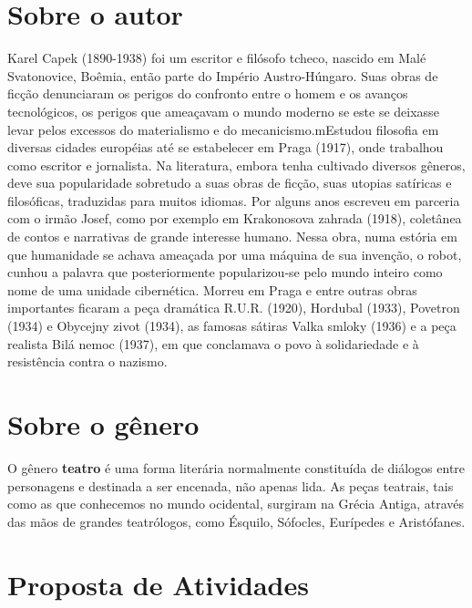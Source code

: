\documentclass[11pt]{extarticle}
\begin{document}

\section{Sobre o autor}

Karel Capek (1890-1938) foi um escritor e filósofo tcheco, nascido em Malé Svatonovice, Boêmia, então parte do Império Austro-Húngaro. Suas obras de ficção denunciaram os perigos do confronto entre o homem e os avanços tecnológicos, os perigos que ameaçavam o mundo moderno se este se deixasse levar pelos excessos do materialismo e do mecanicismo.mEstudou filosofia em diversas cidades européias até se estabelecer em Praga (1917), onde trabalhou como escritor e jornalista. Na literatura, embora tenha cultivado diversos gêneros, deve sua popularidade sobretudo a suas obras de ficção, suas utopias satíricas e filosóficas, traduzidas para muitos idiomas. Por alguns anos escreveu em parceria com o irmão Josef, como por exemplo em Krakonosova zahrada (1918), coletânea de contos e narrativas de grande interesse humano. Nessa obra, numa estória em que humanidade se achava ameaçada por uma máquina de sua invenção, o robot, cunhou a palavra que posteriormente popularizou-se pelo mundo inteiro como nome de uma unidade cibernética. Morreu em Praga e entre outras obras importantes ficaram a peça dramática R.U.R. (1920), Hordubal (1933), Povetron (1934) e Obycejny zivot (1934), as famosas sátiras Valka smloky (1936) e a peça realista Bilá nemoc (1937), em que conclamava o povo à solidariedade e à resistência contra o nazismo.

\section{Sobre o gênero}

O gênero \textbf{teatro} é uma forma literária normalmente constituída de diálogos entre personagens e destinada a ser encenada, não apenas lida. As peças teatrais, tais como as que conhecemos no mundo ocidental, surgiram na Grécia Antiga, através das mãos de grandes teatrólogos, como Ésquilo, Sófocles, Eurípedes e Aristófanes.

\section{Proposta de Atividades}
\end{document}
